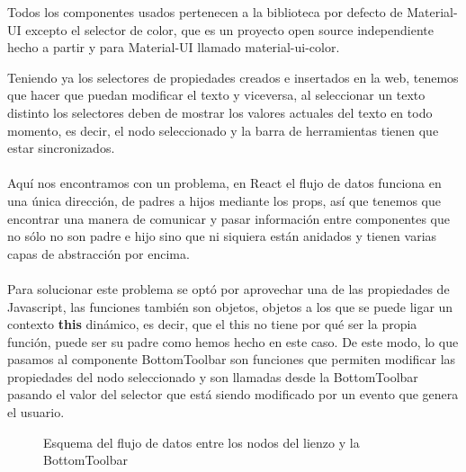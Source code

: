 Todos los componentes usados pertenecen a la biblioteca por defecto de Material-UI excepto el
selector de color, que es un proyecto open source independiente hecho a partir y para Material-UI
llamado material-ui-color\cite{material-ui-color}.

\newpage

Teniendo ya los selectores de propiedades creados e insertados en la web, tenemos que hacer
que puedan modificar el texto y viceversa, al seleccionar un texto distinto los selectores 
deben de mostrar los valores actuales del texto en todo momento, es decir, el nodo seleccionado
y la barra de herramientas tienen que estar sincronizados.
\\\\
Aquí nos encontramos con un problema, en React el flujo de datos funciona en una única dirección,
de padres a hijos mediante los props, así que tenemos que encontrar una manera de comunicar y
pasar información entre componentes que no sólo no son padre e hijo sino que ni siquiera están
anidados y tienen varias capas de abstracción por encima.
\\\\
Para solucionar este problema se optó por aprovechar una de las propiedades de Javascript, 
las funciones también son objetos, objetos a los que se puede ligar un contexto \textbf{this}
dinámico, es decir, que el this no tiene por qué ser la propia función, puede ser su padre como
hemos hecho en este caso.
De este modo, lo que pasamos al componente BottomToolbar son funciones que permiten modificar
las propiedades del nodo seleccionado y son llamadas desde la BottomToolbar pasando el valor 
del selector que está siendo modificado por un evento que genera el usuario.

\begin{figure}[!h]
  \centering
  \noindent{}
  \caption{Esquema del flujo de datos entre los nodos del lienzo y la BottomToolbar}
\end{figure}

